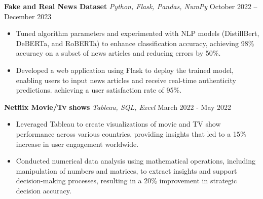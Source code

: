 \documentclass{article}
\begin{document}
\noindent \textbf{Fake and Real News Dataset} \textit{Python, Flask, Pandas, NumPy} \hfill  October 2022 – December 2023
\begin{itemize}[noitemsep,nolistsep,leftmargin=*]
\item {Tuned algorithm parameters and experimented with NLP models (DistillBert, DeBERTa, and RoBERTa) to enhance classification accuracy, achieving 98\% accuracy on a subset of news articles and reducing errors by 50\%.}
\item {Developed a web application using Flask to deploy the trained model, enabling users to input news articles and receive real-time authenticity predictions. achieving a user satisfaction rate of 95\%.}
\end{itemize}

\noindent \textbf{Netflix Movie/Tv shows} \textit{Tableau, SQL, Excel} \hfill  March 2022 - May 2022
\begin{itemize}[noitemsep,nolistsep,leftmargin=*]
\item { Leveraged Tableau to create visualizations of movie and TV show performance across various countries, providing insights that led to a 15\% increase in user engagement worldwide.}
\item {Conducted numerical data analysis using mathematical operations, including manipulation of numbers and matrices, to extract insights and support decision-making processes, resulting in a 20\% improvement in strategic decision accuracy.}
\end{itemize}





\end{document}
